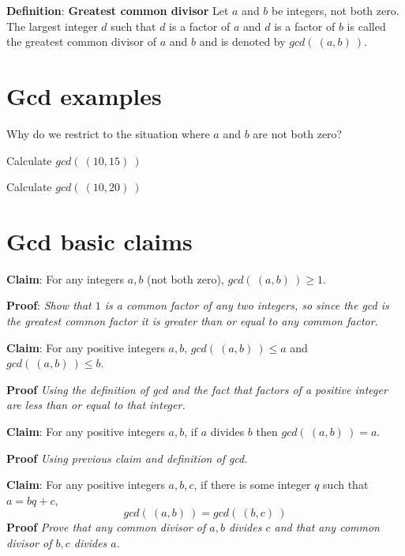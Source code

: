 \documentclass[12pt, oneside]{article}
\begin{document}
{\bf Definition}: {\bf Greatest common divisor} Let $a$ and $b$ be integers, not both zero. The largest integer $d$ such that 
$d$ is a  factor of $a$ and $d$ is a factor of  $b$ is called the greatest common divisor of $a$ and $b$ 
and is denoted by $gcd(~(a, b)~)$. \vfill
\section*{Gcd examples}


Why do we restrict to the situation where $a$ and $b$ are not both zero?

\vspace{50pt}


Calculate $gcd(~(10,15)~)$

\vspace{50pt}

Calculate $gcd(~(10,20)~)$

\vspace{50pt} \vfill
\section*{Gcd basic claims}


{\bf Claim}: For any integers $a,b$ (not both zero), $gcd(~(a,b)~) \geq 1$.

{\bf Proof}: {\it Show that $1$ is a common factor of any two integers, so since the gcd 
is the greatest common factor it is greater than or equal to any common factor.}

\vspace{150pt}

{\bf Claim}: For any positive integers $a,b$, $gcd(~(a,b)~) \leq a$ and $gcd( ~(a,b)~) \leq b$.

{\bf Proof} {\it Using the definition of gcd and the fact that factors of a positive integer
are less than or equal to that integer.}

\vspace{150pt}

{\bf Claim}: For any positive integers $a,b$, if $a$ divides $b$ then $gcd(~(a,b)~) = a$.

{\bf Proof} {\it Using previous claim and definition of gcd.}

\vspace{150pt}


{\bf Claim}: For any positive integers $a,b,c$, if there is some integer $q$ such that $a = bq + c$,
\[
    gcd(~(a,b)~) = gcd (~(b,c)~)
\]
{\bf Proof} {\it Prove that any common divisor of $a,b$ divides $c$ and that any common 
divisor of $b,c$ divides $a$.}
\end{document}
